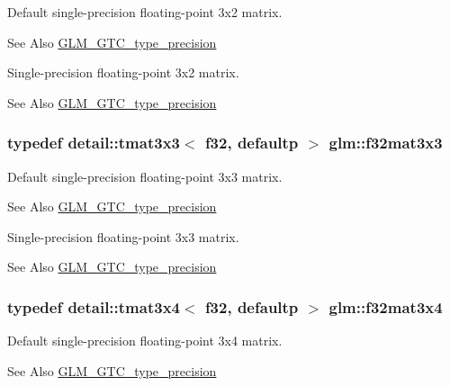 Default single-\/precision floating-\/point 3x2 matrix. \begin{DoxySeeAlso}{See Also}
\hyperlink{group__gtc__type__precision}{G\-L\-M\-\_\-\-G\-T\-C\-\_\-type\-\_\-precision}
\end{DoxySeeAlso}
Single-\/precision floating-\/point 3x2 matrix. \begin{DoxySeeAlso}{See Also}
\hyperlink{group__gtc__type__precision}{G\-L\-M\-\_\-\-G\-T\-C\-\_\-type\-\_\-precision} 
\end{DoxySeeAlso}
\hypertarget{group__gtc__type__precision_ga56465dc40dd0e35221f00bdf44fb7c2e}{
\subsubsection[{f32mat3x3}]{\setlength{\rightskip}{0pt plus 5cm}typedef detail\-::tmat3x3$<$ f32, defaultp $>$ {\bf glm\-::f32mat3x3}}}\label{group__gtc__type__precision_ga56465dc40dd0e35221f00bdf44fb7c2e}
Default single-\/precision floating-\/point 3x3 matrix. \begin{DoxySeeAlso}{See Also}
\hyperlink{group__gtc__type__precision}{G\-L\-M\-\_\-\-G\-T\-C\-\_\-type\-\_\-precision}
\end{DoxySeeAlso}
Single-\/precision floating-\/point 3x3 matrix. \begin{DoxySeeAlso}{See Also}
\hyperlink{group__gtc__type__precision}{G\-L\-M\-\_\-\-G\-T\-C\-\_\-type\-\_\-precision} 
\end{DoxySeeAlso}
\hypertarget{group__gtc__type__precision_ga9d953c44b7bf260d2f2e61d73dc2ab08}{
\subsubsection[{f32mat3x4}]{\setlength{\rightskip}{0pt plus 5cm}typedef detail\-::tmat3x4$<$ f32, defaultp $>$ {\bf glm\-::f32mat3x4}}}\label{group__gtc__type__precision_ga9d953c44b7bf260d2f2e61d73dc2ab08}
Default single-\/precision floating-\/point 3x4 matrix. \begin{DoxySeeAlso}{See Also}
\hyperlink{group__gtc__type__precision}{G\-L\-M\-\_\-\-G\-T\-C\-\_\-type\-\_\-precision}
\end{DoxySeeAlso}
